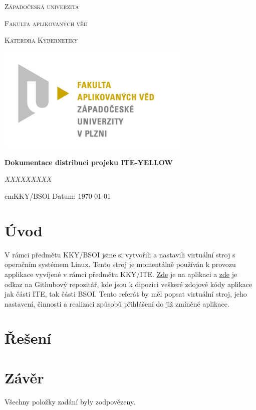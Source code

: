 \documentclass{article}
\begin{document}
\begin{titlepage}

    \centering

    {\scshape\LARGE Západočeská univerzita\par}
    {\scshape\Large Fakulta aplikovaných věd \par}
    {\scshape\Large Katerdra Kybernetiky \par}
    {\begin{center}
            \includegraphics[width=0.7\textwidth]{../pic/fav.jpg}
        \end{center}}

    {\huge\bfseries Dokumentace distribuci projeku ITE-YELLOW\par} %

    \vspace{2cm}

    {\Large\itshape XXXXXXXXX \par}

    \vfill

    \vspace{1cm}

     cm{KKY/BSOI} \hfill {Datum: \today }



\end{titlepage}

\section{Úvod}
V rámci předmětu KKY/BSOI jsme si vytvořili a nastavili virtuální stroj s operačním systémem Linux. 
Tento stroj je momentálně používán k provozu applikace vyvíjené v rámci předmětu KKY/ITE. \href{http://147.228.173.162:8881}{Zde} je na aplikaci a \href{https://github.com/RadekKaupe/ITE-Yellow-2024}{zde} je odkaz na Githubový repozitář, kde jsou k dipozici veškeré zdojové kódy aplikace jak části ITE, tak části BSOI. 
Tento referát by měl popsat virtuální stroj, jeho nastavení, činnosti a realizaci způsobů přihlášení do již zmíněné aplikace.   
\section{Řešení}









\section{Závěr}
Všechny položky zadání byly zodpovězeny.
\end{document}
